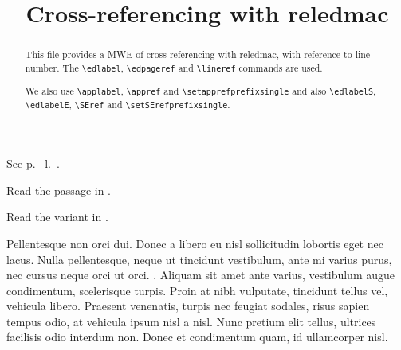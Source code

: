 \documentclass{article}
\begin{document}
\begin{english}
\title{Cross-referencing with reledmac}
\date{}
\maketitle
\begin{abstract}
This file provides a MWE of cross-referencing with reledmac, with reference to line number.
The \verb+\edlabel+, \verb+\edpageref+ and \verb+\lineref+ commands are used. 

We also use \verb+\applabel+, \verb+\appref+ and \verb+\setapprefprefixsingle+
and also \verb+\edlabelS+, \verb+\edlabelE+, \verb+\SEref+ and \verb+\setSErefprefixsingle+.

\end{abstract}
\end{english}

See p.~ l.~.

Read the passage in .

Read the variant in .

\beginnumbering

\pstart
{}Pellentesque non orci dui. Donec a libero eu nisl sollicitudin lobortis eget nec lacus. Nulla pellentesque, neque ut tincidunt vestibulum, ante mi varius purus, nec cursus neque orci ut orci. . Aliquam sit amet ante varius, vestibulum augue condimentum, scelerisque turpis. Proin at nibh vulputate, tincidunt tellus vel, vehicula libero. Praesent venenatis, turpis nec feugiat sodales, risus sapien tempus odio, at vehicula ipsum nisl a nisl. Nunc pretium elit tellus, ultrices facilisis odio interdum non. Donec et condimentum quam, id ullamcorper nisl.
\pend

\endnumbering
\end{document}
